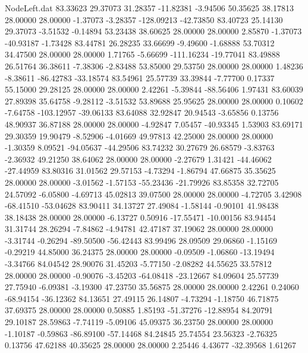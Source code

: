 \begin{filecontents}{NodeLeft.dat}
  83.33623   29.37073   31.28357   -11.82381   -3.94506   50.35625   38.17813   28.00000   28.00000   -1.37073   -3.28357 -128.09213  -42.73850
  83.40723   25.14130   29.37073    -3.51532   -0.14894   53.23438   38.60625   28.00000   28.00000    2.85870   -1.37073  -40.93187   -1.73428
  83.44781   26.28235   33.66699    -9.49600   -1.68888   53.70312   34.47500   28.00000   28.00000    1.71765   -5.66699 -111.16234  -19.77041
  83.49888   26.51764   36.38611    -7.38306   -2.83488   53.85000   29.53750   28.00000   28.00000    1.48236   -8.38611  -86.42783  -33.18574
  83.54961   25.57739   33.39844    -7.77700    0.17337   55.15000   29.28125   28.00000   28.00000    2.42261   -5.39844  -88.56406    1.97431
  83.60039   27.89398   35.64758    -9.28112   -3.51532   53.89688   25.95625   28.00000   28.00000    0.10602   -7.64758 -103.12957  -39.06133
  83.64088   32.92847   20.94543    -3.65856    0.13756   48.90937   36.87188   28.00000   28.00000   -4.92847    7.05457  -40.93345    1.53903
  83.69171   29.30359   19.90479    -8.52906   -4.01669   49.97813   42.25000   28.00000   28.00000   -1.30359    8.09521  -94.05637  -44.29506
  83.74232   30.27679   26.68579    -3.83763   -2.36932   49.21250   38.64062   28.00000   28.00000   -2.27679    1.31421  -44.46062  -27.44959
  83.80316   31.01562   29.57153    -4.73294   -1.86794   47.66875   35.35625   28.00000   28.00000   -3.01562   -1.57153  -55.23436  -21.79926
  83.85358   32.72705   24.57092    -6.05800   -4.69713   45.02813   39.07500   28.00000   28.00000   -4.72705    3.42908  -68.41510  -53.04628
  83.90411   34.13727   27.49084    -1.58144   -0.90101   41.98438   38.18438   28.00000   28.00000   -6.13727    0.50916  -17.55471  -10.00156
  83.94454   31.31744   28.26294    -7.84862   -4.94781   42.47187   37.19062   28.00000   28.00000   -3.31744   -0.26294  -89.50500  -56.42443
  83.99496   28.09509   29.06860    -1.15169   -0.29219   44.85000   36.24375   28.00000   28.00000   -0.09509   -1.06860  -13.19494   -3.34766
  84.04542   28.90076   31.45203    -5.77150   -2.08282   44.55625   33.57812   28.00000   28.00000   -0.90076   -3.45203  -64.08418  -23.12667
  84.09604   25.57739   27.75940    -6.09381   -3.19300   47.23750   35.56875   28.00000   28.00000    2.42261    0.24060  -68.94154  -36.12362
  84.13651   27.49115   26.14807    -4.73294   -1.18750   46.71875   37.69375   28.00000   28.00000    0.50885    1.85193  -51.37276  -12.88954
  84.20791   29.10187   28.59863    -7.74119   -5.09106   45.09375   36.23750   28.00000   28.00000   -1.10187   -0.59863  -86.89100  -57.14468
  84.24845   25.74554   23.56323    -2.76325    0.13756   47.62188   40.35625   28.00000   28.00000    2.25446    4.43677  -32.39568    1.61267

\end{filecontents}
